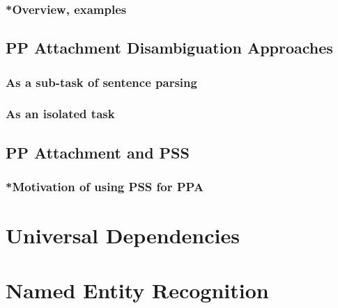\subsubsection{*Overview, examples}
\subsection{PP Attachment Disambiguation Approaches}
\subsubsection{As a sub-task of sentence parsing}
\subsubsection{As an isolated task}
\subsection{PP Attachment and PSS}
\subsubsection{*Motivation of using PSS for PPA}
\pagebreak


\section{Universal Dependencies}
\pagebreak

\section{Named Entity Recognition}
